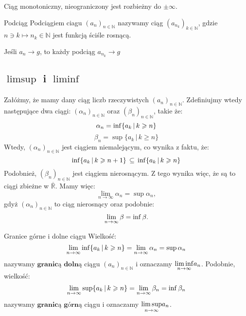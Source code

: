 \documentclass{article}
\newcounter{defi}
\numberwithin{defi}{section}
\numberwithin{defi}{section}
\newcommand{\R}{\mathbb{R}}
\newcommand{\N}{\mathbb{N}}
\newcommand{\oo}{\infty}
\renewcommand{\inf}{\mathop{\mathrm{inf}\vphantom{\mathrm{sup}}}}
\newcommand{\ciag}[1]{(#1_{n})_{n \in \N}}
\newcommand{\gras}[2]{\lim_{#1 \to \oo} #2_{#1}}
\begin{document}
\begin{obs}{}
    Ciąg monotoniczny, nieograniczony jest rozbieżny do $\pm \oo$.
\end{obs}

\begin{defr}{Podciąg}
    Podciągiem ciagu $\ciag{a}$ nazywamy ciąg $(a_{n_k})_{k \in \N}$, gdzie $n \ni k \mapsto n_k \in \N$ jest funkcją ściśle rosnącą.
\end{defr}


\begin{obs}{}
    Jeśli $a_n \to g$, to każdy podciąg $a_{n_k} \to g$
\end{obs}





\subsection{$\limsup$ i $\liminf$}



\paragraph{}
Załóżmy, że mamy dany ciąg liczb rzeczywistych $\ciag{a}$. Zdefiniujmy wtedy następujące dwa ciągi: $\ciag{\alpha}$ oraz $\ciag{\beta}$, takie że: \begin{equation}
    \alpha_n = \inf \{ a_k\, |\, k \geqslant n \}
\end{equation} \begin{equation}
    \beta_n = \sup \{ a_k \, | \, k \geqslant n \}
\end{equation}
Wtedy, $\ciag{\alpha}$ jest ciągiem niemalejącym, co wynika z faktu, że:
\[ \inf \{ a_k\, |\, k \geqslant n + 1 \} \, \subseteq \, \inf \{ a_k\, |\, k \geqslant n \} \]
Podobnież, $\ciag{\beta}$ jest ciągiem nierosnącym. Z tego wynika więc, że są to ciągi zbieżne w $\overline{\R}$.
Mamy więc: \begin{equation}
    \lim_{n \to \infty} \alpha_n = \sup \alpha_n,
\end{equation}
gdyż $\ciag{\alpha}$ to ciąg nierosnący oraz podobnie: \begin{equation}
    \lim_{n \to \infty} \beta = \inf \beta.
\end{equation}

\begin{defr}{Granice górne i dolne ciągu}
    Wielkość: \begin{equation}
        \lim_{n \to \oo} \inf \{ a_k\, |\, k \geqslant n \} = \gras{n}{\alpha} = \sup{\alpha_n}
    \end{equation} nazywamy $\textbf{granicą dolną}$ ciągu $\ciag{a}$ i oznaczamy $\mathlarger{\liminf}_{n \to \oo} a_n$. Podobnie, wielkość: \begin{equation}
        \lim_{n \to \oo} \sup \{ a_k\, |\, k \geqslant n \} = \gras{n}{\beta} = \inf{\beta_n}
    \end{equation} nazywamy $\textbf{granicą górną}$ ciągu i oznaczamy $\mathlarger{\limsup}_{n \to \oo} a_n$.
\end{defr}
\end{document}
